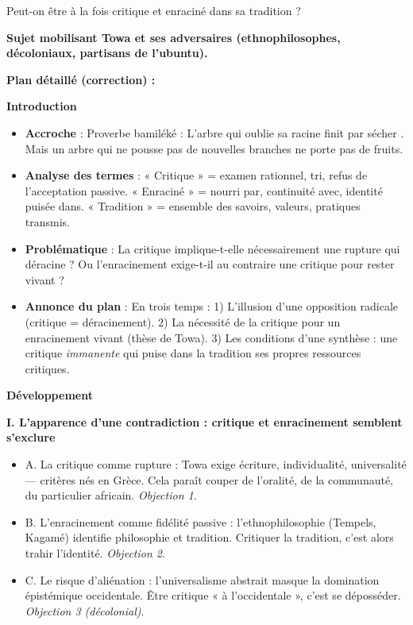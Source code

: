 \documentclass[11pt]{article}
\begin{document}
\begin{exoresolu}
{Peut-on être à la fois critique et enraciné dans sa tradition ?}

\medskip
\textbf{Sujet mobilisant Towa et ses adversaires (ethnophilosophes, décoloniaux, partisans de l'ubuntu).}

\medskip
\textbf{Plan détaillé (correction) :}

\medskip
\textbf{Introduction}
\begin{itemize}
\item \textbf{Accroche} : Proverbe bamiléké : \guillemotleft L'arbre qui oublie sa racine finit par sécher \guillemotright. Mais un arbre qui ne pousse pas de nouvelles branches ne porte pas de fruits.
\item \textbf{Analyse des termes} : « Critique » = examen rationnel, tri, refus de l'acceptation passive. « Enraciné » = nourri par, continuité avec, identité puisée dans. « Tradition » = ensemble des savoirs, valeurs, pratiques transmis.
\item \textbf{Problématique} : La critique implique-t-elle nécessairement une rupture qui déracine ? Ou l'enracinement exige-t-il au contraire une critique pour rester vivant ?
\item \textbf{Annonce du plan} : En trois temps : 1) L'illusion d'une opposition radicale (critique = déracinement). 2) La nécessité de la critique pour un enracinement vivant (thèse de Towa). 3) Les conditions d'une synthèse : une critique \emph{immanente} qui puise dans la tradition ses propres ressources critiques.
\end{itemize}

\medskip
\textbf{Développement}

\textbf{I. L'apparence d'une contradiction : critique et enracinement semblent s'exclure}
\begin{itemize}
\item A. La critique comme rupture : Towa exige écriture, individualité, universalité — critères nés en Grèce. Cela paraît couper de l'oralité, de la communauté, du particulier africain. \emph{Objection 1}.
\item B. L'enracinement comme fidélité passive : l'ethnophilosophie (Tempels, Kagamé) identifie philosophie et tradition. Critiquer la tradition, c'est alors trahir l'identité. \emph{Objection 2}.
\item C. Le risque d'aliénation : l'universalisme abstrait masque la domination épistémique occidentale. Être critique « à l'occidentale », c'est se déposséder. \emph{Objection 3 (décolonial)}.
\end{itemize}


\end{exoresolu}
\end{document}
